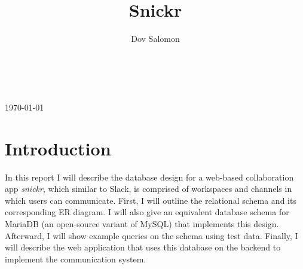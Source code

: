 \documentclass{article}
\title{Snickr}
\author{Dov Salomon}
\renewcommand{\maketitle}{
\begin{center}
{\huge\bfseries\thetitle} \\
\vspace{3pt}
{\large\theauthor} \\
\vspace{3pt}
\today
\end{center}
}
\begin{document}
\maketitle

\section{Introduction}

In this report I will describe the database design for a web-based collaboration app \textit{snickr}, which similar to Slack, is comprised of workspaces and channels in which users can communicate. First, I will outline the relational schema and its corresponding ER diagram. I will also give an equivalent database schema for MariaDB (an open-source variant of MySQL) that implements this design. Afterward, I will show example queries on the schema using test data. Finally, I will describe the web application that uses this database on the backend to implement the communication system.
\end{document}
